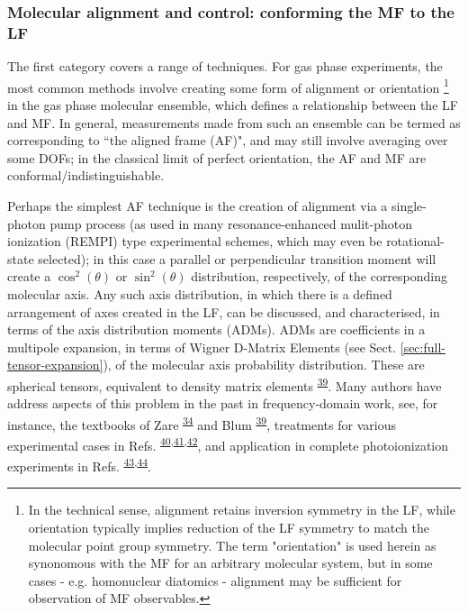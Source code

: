 \documentclass[10pt]{article}
\begin{document}
\subsubsection{Molecular alignment and control: conforming the MF to the LF\label{sec:MF-control}}

The first category covers a range of techniques. For gas phase experiments, the most common methods involve creating some form of alignment or orientation \footnote{In the technical sense, alignment retains 
inversion symmetry in the LF, while orientation typically implies reduction of the LF symmetry to match the molecular point group symmetry. The term "orientation" is used herein as synonomous with the MF for an arbitrary molecular system, but in some cases - e.g. homonuclear diatomics - alignment may be sufficient for observation of MF observables.} 
in the gas phase molecular ensemble, which defines a relationship between the LF and MF. In general, measurements made from such an ensemble can be termed as corresponding to ``the aligned frame (AF)", and may still involve averaging over some DOFs; in the 
classical limit of perfect orientation, the AF and MF are conformal/indistinguishable. 

Perhaps the simplest AF technique is the creation of alignment via a single-photon pump process (as used in many resonance-enhanced mulit-photon ionization (REMPI) type experimental schemes, which may even be rotational-state selected); in this case a parallel or perpendicular transition moment will create a $\cos^2(\theta)$ or $\sin^2(\theta)$ distribution, respectively, of the corresponding molecular axis. Any such axis distribution, in which there is a defined arrangement of axes created in the LF, can be discussed, and characterised, in terms of the axis distribution moments (ADMs). ADMs are coefficients in a multipole expansion, in terms of Wigner D-Matrix Elements (see Sect. \ref{sec:full-tensor-expansion}), of the molecular axis probability distribution. These are spherical tensors, equivalent to density matrix elements \textsuperscript{\hyperref[csl:39]{39}}. Many authors have address aspects of this problem in the past in frequency-domain work, see, for instance, the textbooks of Zare \textsuperscript{\hyperref[csl:34]{34}} and Blum \textsuperscript{\hyperref[csl:39]{39}}, treatments for various experimental cases in Refs. \textsuperscript{\hyperref[csl:40]{40},\hyperref[csl:41]{41},\hyperref[csl:42]{42}}, and application in complete photoionization experiments in Refs. \textsuperscript{\hyperref[csl:43]{43},\hyperref[csl:44]{44}}.
\end{document}
